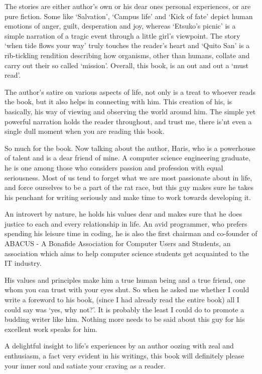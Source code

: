 \documentclass[twoside,11pt,titlepage]{article}
\begin{document}
The stories are either author's own or his dear ones personal experiences, or are pure fiction. Some like `Salvation', `Campus life' and `Kick of fate' depict human emotions of anger, guilt, desperation and joy, whereas `Etsuko's picnic' is a simple narration of a tragic event through a little girl's viewpoint. The story `when tide flows your way' truly touches the reader's heart and `Quito San' is a rib-tickling rendition describing how organisms, other than humans, collate and carry out their so called `mission'. Overall, this book, is an out and out a `must read'.

The author's satire on various aspects of life, not only is a treat to whoever reads the book, but it also helps in connecting with him. This creation of his, is basically, his way of viewing and observing the world around him. The simple yet powerful narration holds the reader throughout, and trust me, there is'nt even a single dull moment when you are reading this book. 

So much for the book. Now talking about the author, Haris, who is a powerhouse of talent and is a dear friend of mine. A computer science engineering graduate, he is one among those who considers passion and profession with equal seriousness. Most of us tend to forget what we are most passionate about in life, and force ourselves to be a part of the rat race, but this guy makes sure he takes his penchant for writing seriously and make time to work towards developing it.

An introvert by nature, he holds his values dear and makes sure that he does justice to each and every relationship in life. An avid programmer, who prefers spending his leisure time in coding, he is also the first chairman and co-founder of ABACUS - A Bonafide Association for Computer Users and Students, an association which aims to help computer science students get acquainted to the IT industry.

His values and principles make him a true human being and a true friend, one whom you can trust with your eyes shut. So when he asked me whether I could write a foreword to his book, (since I had already read the entire book) all I could say was `yes, why not?'. It is probably the least I could do to promote a budding writer like him. Nothing more needs to be said about this guy for his excellent work speaks for him.

A delightful insight to life's experiences by an author oozing with zeal and enthusiasm, a fact very evident in his writings, this book will definitely please your inner soul and satiate your craving as a reader.
\end{document}
